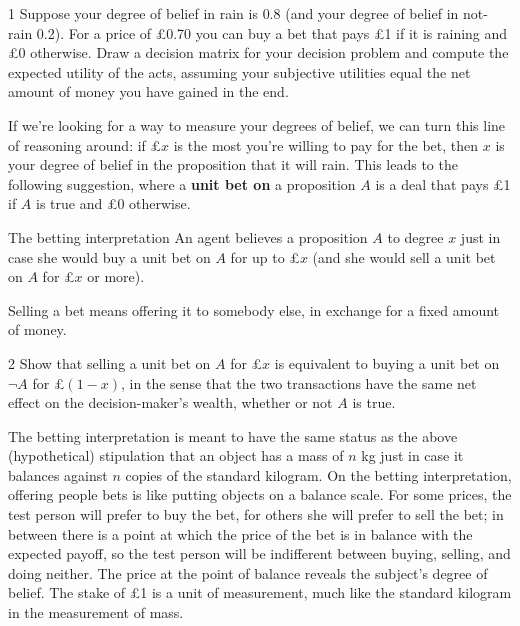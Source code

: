 \begin{exercise}{1}
  Suppose your degree of belief in rain is $0.8$ (and your degree of
  belief in not-rain 0.2). For a price of £0.70 you can buy a bet that
  pays £1 if it is raining and £0 otherwise. Draw a decision
  matrix for your decision problem and compute the expected utility of
  the acts, assuming your subjective utilities equal the net amount of
  money you have gained in the end.
\end{exercise}

If we're looking for a way to measure your degrees of belief, we can turn this
line of reasoning around: if £$x$ is the most you're willing to pay for the bet,
then $x$ is your degree of belief in the proposition that it will rain. This
leads to the following suggestion, where a \textbf{unit bet on} a proposition
$A$ is a deal that pays £1 if $A$ is true and £0 otherwise.

\begin{genericthm}{The betting interpretation}
  An agent believes a proposition $A$ to degree $x$ just in case she would buy a
  unit bet on $A$ for up to £$x$ (and she would sell a unit bet on $A$ for £$x$
  or more).
\end{genericthm}
%
Selling a bet means offering it to somebody else, in exchange for a fixed amount
of money.

\begin{exercise}{2}
  Show that selling a unit bet on $A$ for £$x$ is equivalent to buying a unit
  bet on $\neg A$ for £$(1-x)$, in the sense that the two transactions have the
  same net effect on the decision-maker's wealth, whether or not $A$ is true.
  

  
\end{exercise}

The betting interpretation is meant to have the same status as the above
(hypothetical) stipulation that an object has a mass of $n$ kg just in case it
balances against $n$ copies of the standard kilogram. On the betting
interpretation, offering people bets is like putting objects on a balance scale.
For some prices, the test person will prefer to buy the bet, for others she will
prefer to sell the bet; in between there is a point at which the price of the
bet is in balance with the expected payoff, so the test person will be
indifferent between buying, selling, and doing neither. The price at the point
of balance reveals the subject's degree of belief. The stake of £1 is a unit of
measurement, much like the standard kilogram in the measurement of mass.

